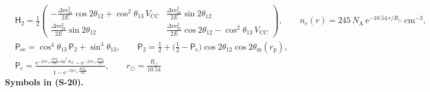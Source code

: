 \documentclass[
  10pt,
]{article}
\begin{document}
\[
\begin{aligned}
&\mathsf{H}_{2} = \frac12\begin{pmatrix}-\frac{\Delta m^2_{21}}{2E}\cos2\theta_{12} + \cos^2\theta_{13}\,V_{\mathrm{CC}} & \frac{\Delta m^2_{21}}{2E}\sin2\theta_{12}\\
 \frac{\Delta m^2_{21}}{2E}\sin2\theta_{12} & \frac{\Delta m^2_{21}}{2E}\cos2\theta_{12} - \cos^2\theta_{13}\,V_{\mathrm{CC}}\end{pmatrix},\qquad
 n_e(r) = 245\,N_{\mathrm{A}}\,\mathrm{e}^{-10.54\,r/R_\odot}\ \text{cm}^{-3},\\
&\mathsf{P}_{\mathrm{ee}} = \cos^4\theta_{13}\,\mathsf{P}_{2} + \sin^4\theta_{13},\qquad
 \mathsf{P}_{2} = \frac12 + \Big(\frac12 - \mathsf{P}_{\mathrm{c}}\Big)\cos2\theta_{12}\cos2\theta_{\mathrm{m}}(r_{\mathrm{p}}),\\
&\mathsf{P}_{\mathrm{c}} = \frac{\mathrm{e}^{-2\pi r_{\odot}\frac{\Delta m^2_{21}}{2E}\sin^2\theta_{12}} - \mathrm{e}^{-2\pi r_{\odot}\frac{\Delta m^2_{21}}{2E}}}
 {1 - \mathrm{e}^{-2\pi r_{\odot}\frac{\Delta m^2_{21}}{2E}}},\qquad r_{\odot} = \frac{R_\odot}{10.54}
\end{aligned} \tag{S-20}
\] \textbf{Symbols in (S-20).}
\end{document}
